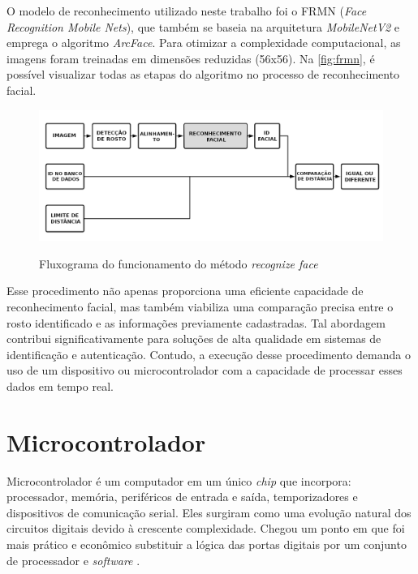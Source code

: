 O modelo de reconhecimento utilizado neste trabalho foi o FRMN 
(\textit{Face Recognition Mobile Nets}), que 
também se baseia na arquitetura \textit{MobileNetV2} e emprega o 
algoritmo \textit{ArcFace}. Para otimizar a complexidade computacional, 
as imagens foram treinadas em dimensões reduzidas (56x56). 
Na \autoref{fig:frmn}, 
é possível visualizar todas as etapas do algoritmo 
no processo de reconhecimento facial.

\begin{figure}[h!]
    \centering
    \caption{Fluxograma do funcionamento do método \textit{recognize face}}
    \includegraphics[scale=0.3]{figuras/face-recognition.png}
    \label{fig:frmn}
    \centering
\end{figure}


Esse procedimento não apenas proporciona uma eficiente capacidade de 
reconhecimento facial, mas também viabiliza uma comparação precisa entre 
o rosto identificado e as informações previamente cadastradas. Tal abordagem 
contribui significativamente para soluções de alta qualidade em sistemas de 
identificação e autenticação. Contudo, a execução desse procedimento demanda 
o uso de um dispositivo ou microcontrolador com a capacidade de processar 
esses dados em tempo real. 

\section{Microcontrolador}\label{sec:microcontrolador}

Microcontrolador é um computador em um único \textit{chip} que incorpora: processador, 
memória, periféricos de entrada e saída, temporizadores e dispositivos de 
comunicação serial. Eles surgiram como uma evolução natural dos circuitos digitais 
devido à crescente complexidade. Chegou um ponto em que foi mais prático e 
econômico substituir a lógica das portas digitais por um conjunto de 
processador e \textit{software} \cite{penido2013}.

